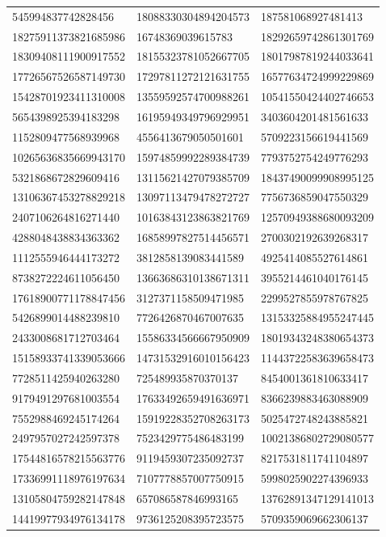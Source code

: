 \begin{longtable}{*{3}{l}}
545994837742828456&18088330304894204573&187581068927481413\\
18275911373821685986&16748369039615783&18292659742861301769\\
18309408111900917552&18155323781052667705&18017987819244033641\\
17726567526587149730&17297811272121631755&16577634724999229869\\
15428701923411310008&13559592574700988261&10541550424402746653\\
5654398925394183298&16195949349796929951&3403604201481561633\\
1152809477568939968&4556413679050501601&5709223156619441569\\
10265636835669943170&15974859992289384739&7793752754249776293\\
5321868672829609416&13115621427079385709&18437490099908995125\\
13106367453278829218&13097113479478272727&7756736859047550329\\
2407106264816271440&10163843123863821769&12570949388680093209\\
4288048438834363362&16858997827514456571&2700302192639268317\\
1112555946444173272&3812858139083441589&4925414085527614861\\
8738272224611056450&13663686310138671311&3955214461040176145\\
17618900771178847456&3127371158509471985&2299527855978767825\\
5426899014488239810&7726426870467007635&13153325884955247445\\
2433008681712703464&15586334566667950909&18019343248380654373\\
15158933741339053666&14731532916010156423&11443722583639658473\\
7728511425940263280&725489935870370137&8454001361810633417\\
9179491297681003554&17633492659491636971&8366239883463088909\\
7552988469245174264&15919228352708263173&5025472748243885821\\
2497957027242597378&7523429775486483199&10021386802729080577\\
17544816578215563776&9119459307235092737&8217531811741104897\\
17336991118976197634&7107778857007750915&5998025902274396933\\
13105804759282147848&657086587846993165&13762891347129141013\\
14419977934976134178&9736125208395723575&5709359069662306137\\

\end{longtable}
